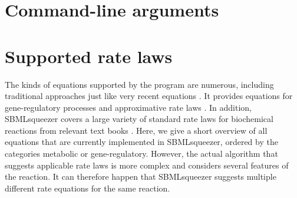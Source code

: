 \chapter{Command-line arguments}

\chapter{Supported rate laws}\label{chap:RateLaws}

The kinds of equations supported by the program are
numerous, including traditional approaches \citep{Guldberg1879, Michaelis1913}
just like very recent equations \citep{Liebermeister2006, Liebermeister2010}.
It provides equations for gene-regulatory processes
\citep{Hinze2007, Radde2007a, Toepfer2007, Vu2007,Weaver1999} and approximative
rate laws \citep{Savageau1969}.
In addition, SBMLsqueezer covers a large variety of standard rate laws for
biochemical reactions from relevant text books
\citep{Segel1993, Heinrich1996, Bisswanger2000, Cornish-Bowden2004}.
Here, we give a short overview of all equations that are currently implemented
in SBMLsqueezer, ordered by the categories metabolic or gene-regulatory.
However, the actual algorithm that suggests applicable rate laws is more complex
and considers several features of the reaction.
It can therefore happen that SBMLsqueezer suggests multiple different rate
equations for the same reaction.

